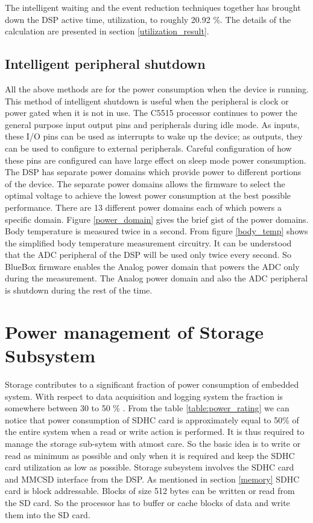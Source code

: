  \hspace{10mm}The intelligent waiting and the event reduction techniques together has brought down the DSP active time, utilization, to roughly 20.92 \%. The details of the calculation are presented in section \ref{utilization_result}.

\subsection{Intelligent peripheral shutdown}
All the above methods are for the power consumption when the device is running. This method of intelligent shutdown is useful when the peripheral is clock or power gated when it is not in use. The C5515 processor continues to power the general purpose input output pins and peripherals during idle mode. As inputs, these I/O pins can be used as interrupts to wake up the device; as outputs, they can be used to configure to external peripherals. Careful configuration of how these pins are configured can have large effect on sleep mode power consumption. The DSP has separate power domains which provide power to different portions of the device. The separate power domains allows the firmware to select the optimal voltage to achieve the lowest power consumption at the best possible performance. There are 13 different power domains each of which powers a specific domain. Figure \ref{power_domain} gives the brief gist of the power domains. Body temperature is measured twice in a second. From figure \ref{body_temp} shows the simplified body temperature measurement circuitry. It can be understood that the ADC peripheral of the DSP will be used only twice every second. So BlueBox firmware enables the Analog power domain that powers the ADC only during the measurement. The Analog power domain and also the ADC peripheral is shutdown during the rest of the time. 

\section{Power management of Storage Subsystem}
Storage contributes to a significant fraction of power consumption of embedded system. With respect to data acquisition and logging system the fraction is somewhere between 30 to 50 \% . From the table \ref{table:power_rating} we can notice that power consumption of SDHC card is approximately equal to 50\% of the entire system when a read or write action is performed. It is thus required to manage the storage sub-sytem with atmost care. So the basic idea is to write or read as minimum as possible and only when it is required and keep the SDHC card utilization as low as possible.
Storage subsystem involves the SDHC card and MMCSD interface from the DSP. As mentioned in section \ref{memory} SDHC card is block addressable. Blocks of size 512 bytes can be written or read from the SD card. So the processor has to buffer or cache blocks of data and write them into the SD card.  


